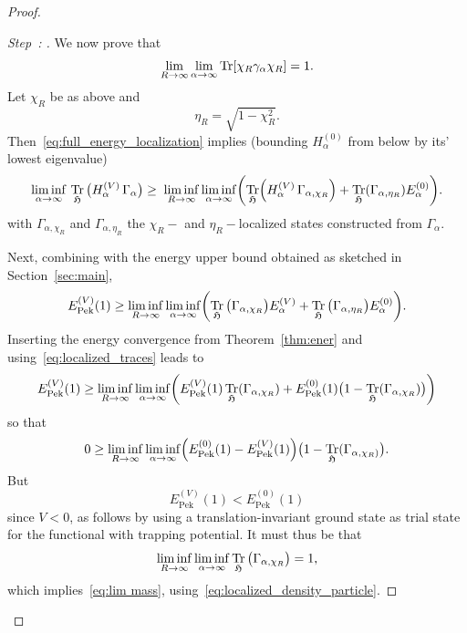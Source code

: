 \documentclass[AHL,Unicode,longabstracts,published]{cedram}
\DeclareMathOperator{\Tr}{Tr}
\DeclareMathOperator{\Pek}{Pek}
\newcommand{\gH}{\mathfrak{H}}
\newcommand{\1}{\mathds{1}}
\renewcommand*{\to}{\mathchoice{\longrightarrow}{\rightarrow}{\rightarrow}{\rightarrow}}
\newcounter{setofstep}
\newcounter{step}[setofstep]
\newenvironment{step}[1][]{\refstepcounter{step}\begin{proof}[{Step~\thestep\if#1\empty\else: #1\fi}]}{\let\qed\relax\end{proof}}
\let\originalleft\left
\let\originalright\right
\renewcommand{\left}{\mathopen{}\mathclose\bgroup\originalleft}
\renewcommand{\right}{\aftergroup\egroup\originalright}
\begin{document}
\begin{proof}
\begin{step}
We now prove that
\begin{equation}\label{eq:lim mass}
\lim_{R\to \infty}\lim_{\alpha \to \infty} \Tr \left[\chi_R \gamma_\alpha \chi_R \right] = 1.
\end{equation}
Let $\chi_R$ be as above and
\begin{equation*}
\eta_R = \sqrt{1-\chi_R^2}.
\end{equation*}
Then~\eqref{eq:full_energy_localization} implies (bounding $H_\alpha^{(0)}$ from below by its' lowest eigenvalue)
\begin{equation*}
\liminf_{\alpha\to\infty}\, \Tr_{ \gH}\big(H_\alpha^{(V)}\, \Gamma_\alpha\big)
\ge\; \liminf_{R\to\infty} \liminf_{\alpha\to\infty} \left(\Tr_{ \gH}\left(H_\alpha^{(V)}\, \Gamma_{\alpha,\chi_R}\right) +\Tr_{ \gH} \left(\Gamma_{\alpha,\eta_R}\right) E^{(0)}_\alpha\right).
\end{equation*}
with $\Gamma_{\alpha,\chi_R}$ and $ \Gamma_{\alpha,\eta_R}$ the $\chi_R-$ and $\eta_R-$localized states constructed from $\Gamma_\alpha$.

Next, combining with the energy upper bound obtained as sketched in Section~\ref{sec:main},
\begin{equation*}
E_{\Pek}^{(V)}(1) \geq \liminf_{R\to\infty} \liminf_{\alpha\to\infty} \left(\Tr_{ \gH} \big(\Gamma_{\alpha,\chi_R}\big) E^{(V)}_\alpha + \Tr_{ \gH} \big(\Gamma_{\alpha,\eta_R}\big) E^{(0)}_\alpha \right).
\end{equation*}
Inserting the energy convergence from Theorem~\ref{thm:ener} and using~\eqref{eq:localized_traces} leads to
\begin{equation*}
E_{\Pek}^{(V)}(1) \geq \liminf_{R\to\infty} \liminf_{\alpha\to\infty} \left(E_{\Pek}^{(V)}(1)\Tr_{ \gH} \left(\Gamma_{\alpha,\chi_R}\right) + E_{\Pek}^{(0)}(1)\bigl(1-\Tr_{ \gH} \left(\Gamma_{\alpha,\chi_R}\right)\bigr)\right)
\end{equation*}
so that
\begin{equation*}
0 \geq \liminf_{R\to\infty} \liminf_{\alpha\to\infty}\left(E_{\Pek}^{(0)}(1) - E_{\Pek}^{(V)}(1)\right) \bigl(1-\Tr_{ \gH} (\Gamma_{\alpha,\chi_R)}\bigr).
\end{equation*}
But
\begin{equation*}
E_{\Pek}^{(V)}(1) < E_{\Pek}^{(0)}(1)
\end{equation*}
since $V < 0$, as follows by using a translation-invariant ground state as trial state for the functional with trapping potential. It must thus be that
\begin{equation*}
\liminf_{R\to\infty} \liminf_{\alpha\to\infty} \Tr_{ \gH} \big(\Gamma_{\alpha,\chi_R}\big) = 1,
\end{equation*}
which implies~\eqref{eq:lim mass}, using~\eqref{eq:localized_density_particle}.
\end{step}


\end{proof}
\end{document}
